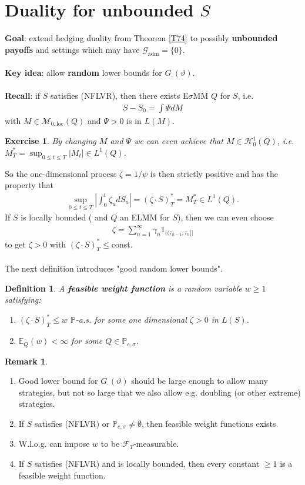 \documentclass[12pt,a4paper, twoside]{article}
\newtheorem{defn}{Definition}[section]
\newtheorem{exe}{Exercise}[section]
\theoremstyle{definition}
\newtheorem{rem}{Remark}[section]
\newcommand{\EE}{\mathbb{E}} %
\newcommand{\PP}{\mathbb{P}} %
\begin{document}
\section{Duality for unbounded $S$}
\textbf{Goal}: extend hedging duality from Theorem \ref{T74} to possibly \textbf{unbounded payoffs} and settings which may have $\mathcal{G}_\text{adm}= \{0 \}$. \\\\
\textbf{Key idea}: allow \textbf{random} lower bounds for $G_\cdot ( \vartheta)$. 
\\\\
\textbf{Recall}: if $S$ satisfies (NFLVR), then there exists E$\sigma$MM $Q$ for $S$, i.e. 
\begin{align*}
S-S_0 = \int \Psi dM
\end{align*}
with $M \in \mathcal{M}_{0, \text{loc}}(Q)$ and $\Psi >0$ is in $L(M)$. 
\begin{exe} By changing $M$ and $\Psi$ we can even achieve that $M \in \mathcal{H}_0^1( Q)$, i.e. $M_T^* = \sup_{0 \leq t \leq T} |M_t| \in L^1(Q)$. 
\end{exe}
\noindent So the one-dimensional process $\zeta = 1/ \psi$ is then strictly positive and has the property that 
\begin{align*}
\sup_{0 \leq t \leq T} \left| \int_0^t \zeta_u dS_u \right| = ( \zeta \cdot S)_T^* = M_T^* \in L^1(Q).
\end{align*}
If $S$ is locally bounded ( and $Q$ an ELMM for $S$), then we can even choose 
\begin{align*}
\zeta = \sum_{n=1}^\infty \gamma_n 1_{(\!( \tau_{n-1}, \tau_n ]\!]}
\end{align*}
to get $\zeta >0$ with $( \zeta \cdot S)_T^* \leq$const. 
\\\\
The next definition introduces "good random lower bounds".
\begin{defn} A \textbf{feasible weight function} is a random variable $w \geq 1$ satisfying:
\begin{enumerate}
\item $( \zeta \cdot S)_T^* \leq w$ $\PP$-a.s. for some one dimensional $\zeta >0$ in $L(S)$. 
\item $\EE_Q(w) < \infty$ for some $Q \in \PP_{e, \sigma}$. 
\end{enumerate}
\end{defn}
\begin{rem} \
\begin{enumerate}
\item Good lower bound for $G_\cdot ( \vartheta)$ should be large enough to allow many strategies, but not so large that we also allow e.g. doubling (or other extreme) strategies.
\item If $S$ satisfies (NFLVR) or $\PP_{e, \sigma} \neq \emptyset$, then feasible weight functions exists. 
\item W.l.o.g. can impose $w$ to be $\mathcal{F}_T$-measurable. 
\item If $S$ satisfies (NFLVR) and is locally bounded, then every constant $\geq 1$ is a feasible weight function. 
\end{enumerate}
\end{rem}
\end{document}
